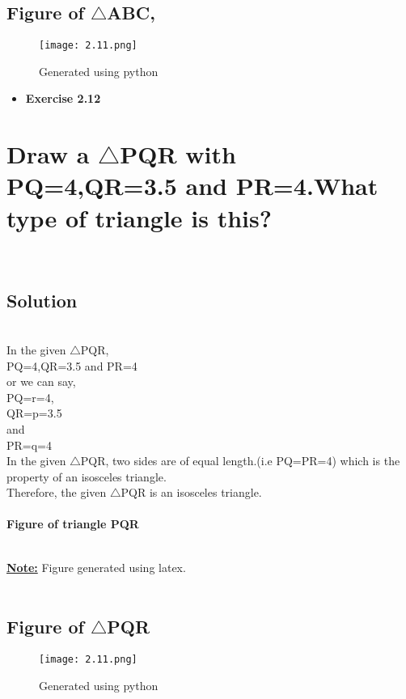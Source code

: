 \documentclass[a4paper,12pt]{article}
\begin{document}
\subsection{Figure of $\triangle$ABC,}
\begin{figure}[htp]
    \centering
    \texttt{[image: 2.11.png]}
    \caption{Generated using python}
    \label{fig:2}
\end{figure}
 \newpage
 \begin{itemize}
	    \item \Large\textbf{Exercise 2.12}
	\end{itemize}
	\section{Draw a $\triangle$PQR with PQ=4,QR=3.5 and PR=4.What type of triangle is this?}\\
    	
\subsection{Solution} \\
  In the given $\triangle$PQR, \\
   PQ=4,QR=3.5 and PR=4\\
   or we can say,\\
   PQ=r=4,\\QR=p=3.5\\ and\\ PR=q=4\\
  
   In the given $\triangle$PQR, two sides are of equal length.(i.e PQ=PR=4) \hspace{0.5cm}{or} \hspace{0.5cm}{(r=q=4)} which is the property of an isosceles triangle.\\
  
  Therefore, the given $\triangle$PQR is an isosceles triangle.\\
   \\
  
\textbf{Figure of triangle PQR}

\\
    \textbf{\underline{Note:}} {Figure generated using latex.}\\$$$$\\

\subsection{Figure of $\triangle$PQR}
\begin{figure}[htp]
    \centering
    \texttt{[image: 2.11.png]}
    \caption{Generated using python}
    \label{fig:2}
\end{figure}
\end{document}
